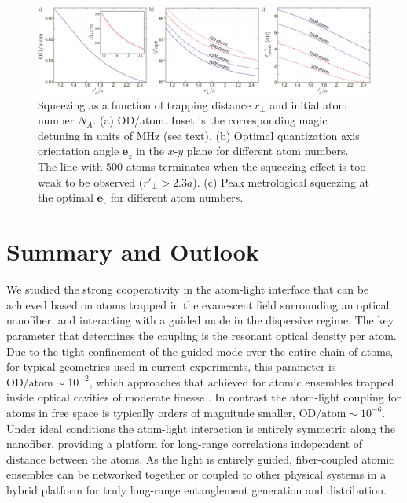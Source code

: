 \documentclass[aps,pra,twocolumn]{revtex4-1} %
\newcommand{\qaxis}{\mathbf{e}_{\tilde{z}}}
\begin{document}
\begin{figure}[t]\includegraphics[scale=0.4]{./Figs/Fig_SqueezingDistance}
\caption{Squeezing as a function of trapping distance $r_\perp$ and initial atom number $N_A$. 
(a) OD/atom. Inset is the corresponding magic detuning in units of MHz {\color{blue} (see text)}.
(b) Optimal quantization axis orientation angle $\qaxis$ in the $x$-$y$ plane for different atom numbers. 
The line with $ 500 $ atoms {\color{blue} terminates} when the squeezing effect is too weak to be observed ($ r'\!_\perp>2.3a $).
(c) Peak metrological squeezing at the optimal $\qaxis$ for different atom numbers.} \label{Fig::Squeezing_Distance}
\end{figure}


\section{Summary and Outlook} \label{Sec::Conclusion}

We studied the strong cooperativity in the atom-light interface that can be achieved based on {\color{blue} atoms trapped in the evanescent field surrounding an optical nanofiber, and interacting with a guided mode in the dispersive regime.} The key parameter that determines the coupling is the {\color{blue} resonant} optical density per atom. Due to the tight confinement of the guided mode over the entire chain of atoms, for typical geometries used in current experiments, this parameter is $ \mathrm{OD}/\mathrm{atom}\sim 10^{-2} $, which approaches that achieved for atomic ensembles trapped inside optical cavities of moderate finesse \cite{chen_conditional_2011, zhang_collective_2012}.  
In contrast the atom-light coupling for atoms in free space is typically orders of magnitude smaller, $ \mathrm{OD}/\mathrm{atom} \sim 10^{-6}$.  
Under ideal conditions the atom-light interaction is entirely symmetric along the nanofiber, providing a platform for long-range correlations independent of distance between the atoms. 
As the light is entirely guided, fiber-coupled atomic ensembles can be networked together or coupled to other physical systems in a hybrid platform \cite{hafezi_atomic_2012, liebermeister_tapered_2014} for truly long-range entanglement generation and distribution. 
\end{document}
